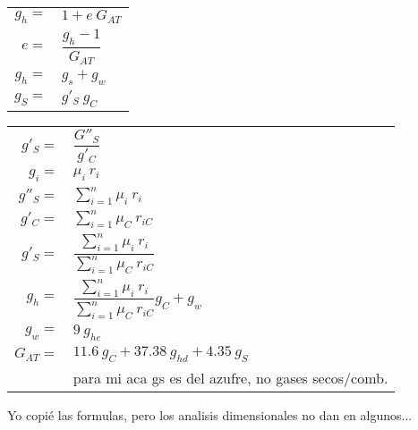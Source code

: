 \documentclass[11pt,a4paper]{article}
\begin{document}
\begin{cajita}
\begin{multicols}{2}
\begin{tabular}{r p{}}
			\end{tabular}
			\begin{tabular}{r l }
			$g_{h}=$&$1+e~G_{AT}$\\[0.2cm]
			$e=$&$\dfrac{g_{h}-1}{G_{AT}}$\\
			$g_{h}=$&$g_{s}+g_{w}$\\
			$g_{S}=$&$g'_{S}~g_{C}$\\
			\end{tabular}
			\begin{tabular}{r l }
				$g'_{S}=$&$\dfrac{G''_{S}}{g'_{C}}$\\
				$g_{i}=$&$\mu_{i}~r_{i}$\\[0.3cm]
				$g''_{S}=$&$\displaystyle \sum_{i=1}^{n} \mu_{i}~r_{i}$\\[0.3cm]
				$g'_{C}=$&$\displaystyle \sum_{i=1}^{n} \mu_{C}~r_{iC}$\\[0.3cm]
				$g'_{S}=$&$\dfrac{\sum_{i=1}^{n} \mu_{i}~r_{i}}{\sum_{i=1}^{n} \mu_{C}~r_{iC}}$\\[0.3cm]
				$g_{h}=$&$\dfrac{\sum_{i=1}^{n} \mu_{i}~r_{i}}{\sum_{i=1}^{n} \mu_{C}~r_{iC}} g_{C}+g_{w}$\\[0.35cm]
				$g_{w}=$&$9~g_{he}$\\[0.1cm]
				$G_{AT}=$&$11.6~g_{C}+37.38~g_{hd}+4.35~g_{S}$\\
				&\tiny{para mi aca gs es del azufre, no gases secos/comb.}
			\end{tabular}
		\end{multicols}
	Yo copié las formulas, pero los analisis dimensionales no dan en algunos...
	\end{cajita}
		
	\begin{cajita}
	\end{cajita}
\end{document}
